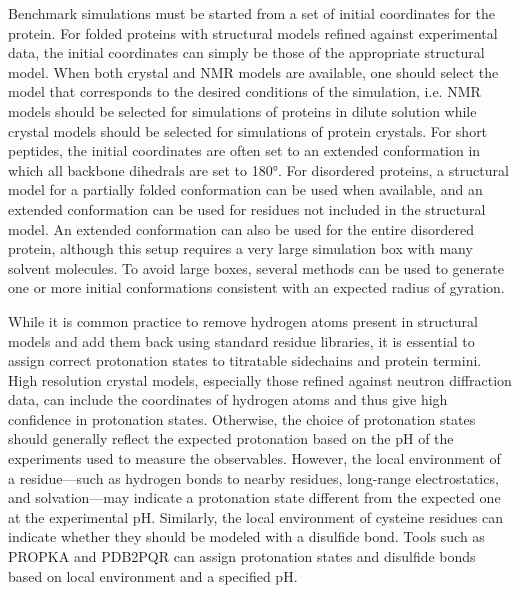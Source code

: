 \documentclass[9pt,review]{livecoms}
\begin{document}
Benchmark simulations must be started from a set of initial coordinates for the protein.
For folded proteins with structural models refined against experimental data, the initial coordinates can simply be those of the appropriate structural model.
When both crystal and NMR models are available, one should select the model that corresponds to the desired conditions of the simulation, i.e. NMR models should be selected for simulations of proteins in dilute solution while crystal models should be selected for simulations of protein crystals.
For short peptides, the initial coordinates are often set to an extended conformation in which all backbone dihedrals are set to \ang{180}.
For disordered proteins, a structural model for a partially folded conformation can be used when available, and an extended conformation can be used for residues not included in the structural model.
An extended conformation can also be used for the entire disordered protein, although this setup requires a very large simulation box with many solvent molecules.
To avoid large boxes, several methods \cite{feldman_fast_2000,feldman_probabilistic_2002,ozenne_flexible-meccano_2012,estana_realistic_2019,ferrie_unified_2020,teixeira_idpconformergenerator_2022} can be used to generate one or more initial conformations consistent with an expected radius of gyration.

While it is common practice to remove hydrogen atoms present in structural models and add them back using standard residue libraries, it is essential to assign correct protonation states to titratable sidechains and protein termini.
High resolution crystal models, especially those refined against neutron diffraction data, can include the coordinates of hydrogen atoms and thus give high confidence in protonation states.
Otherwise, the choice of protonation states should generally reflect the expected protonation based on the pH of the experiments used to measure the observables.
However, the local environment of a residue---such as hydrogen bonds to nearby residues, long-range electrostatics, and solvation---may indicate a protonation state different from the expected one at the experimental pH.
Similarly, the local environment of cysteine residues can indicate whether they should be modeled with a disulfide bond.
Tools such as PROPKA \cite{olsson_propka3_2011} and PDB2PQR \cite{jurrus_improvements_2018} can assign protonation states and disulfide bonds based on local environment and a specified pH.
\end{document}
